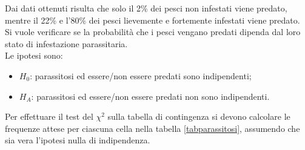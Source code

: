 \documentclass[10pt, draft]{book}
\newcounter{example}[section]
\begin{document}
\begin{example}
\begin{figure}[H]
    \caption{\small{}}
    \end{figure}
Dai dati ottenuti risulta che solo il 2\% dei pesci non infestati viene predato, mentre il 22\% e l'80\% dei pesci lievemente e fortemente infestati viene predato.
\\
Si vuole verificare se la probabilità che i pesci vengano predati dipenda dal loro stato di infestazione parassitaria.
\\
Le ipotesi sono:
\begin{itemize}
    \item $H_0$: parassitosi ed essere/non essere predati sono indipendenti;
    \item $H_A$: parassitosi ed essere/non essere predati non sono indipendenti.
\end{itemize}
Per effettuare il test del $\chi^2$ sulla tabella di contingenza si devono calcolare le frequenze attese per ciascuna cella nella tabella \ref{tabparassitosi}, assumendo che sia vera l'ipotesi nulla di indipendenza.


\end{example}
\end{document}
